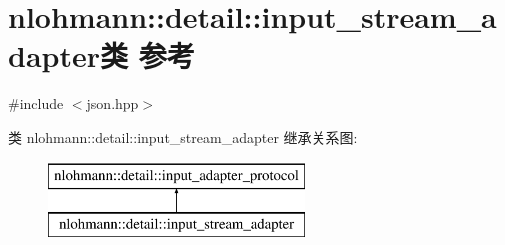 \hypertarget{classnlohmann_1_1detail_1_1input__stream__adapter}{}\section{nlohmann\+::detail\+::input\+\_\+stream\+\_\+adapter类 参考}
\label{classnlohmann_1_1detail_1_1input__stream__adapter}


{\ttfamily \#include $<$json.\+hpp$>$}

类 nlohmann\+::detail\+::input\+\_\+stream\+\_\+adapter 继承关系图\+:\begin{figure}[H]
\begin{center}
\leavevmode
\includegraphics[height=2.000000cm]{classnlohmann_1_1detail_1_1input__stream__adapter}
\end{center}
\end{figure}
